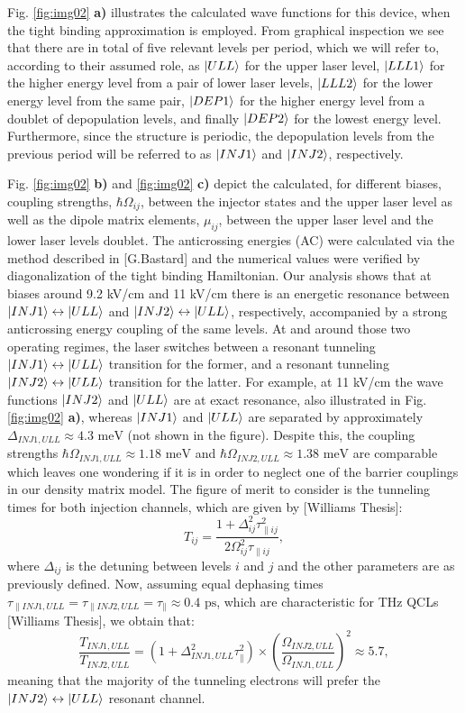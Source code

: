 \documentclass[10pt,letterpaper]{article}
\begin{document}
{Fig. \ref{fig:img02} \textbf{a)} illustrates the calculated wave functions for this device, when the tight binding approximation is employed. From graphical inspection we see that there are in total of five relevant levels per period, which we will refer to, according to their assumed role, as $\Ket{ULL}$ for the upper laser level, $\Ket{LLL1}$ for the higher energy level from a pair of lower laser levels, $\Ket{LLL2}$ for the lower energy level from the same pair, $\Ket{DEP1}$ for the higher energy level from a doublet of depopulation levels, and finally $\Ket{DEP2}$ for the lowest energy level. Furthermore, since the structure is periodic, the depopulation levels from the previous period will be referred to as $\Ket{INJ1}$ and $\Ket{INJ2}$, respectively.

Fig. \ref{fig:img02} \textbf{b)} and \ref{fig:img02} \textbf{c)} depict the calculated, for different biases, coupling strengths, $\hbar \Omega_{ij}$, between the injector states and the upper laser level as well as the dipole matrix elements, $\mu_{ij}$, between the upper laser level and the lower laser levels doublet. The anticrossing energies (AC) were calculated via the method described in [G.Bastard] and the numerical values were verified by diagonalization of the tight binding Hamiltonian. Our analysis shows that at biases around 9.2 kV/cm and 11 kV/cm there is an energetic resonance between $\Ket{INJ1} \leftrightarrow \Ket{ULL}$ and $\Ket{INJ2} \leftrightarrow \Ket{ULL}$, respectively, accompanied by a strong anticrossing energy coupling of the same levels. At and around those two operating regimes, the laser switches between a resonant tunneling $\Ket{INJ1}\leftrightarrow \Ket{ULL}$ transition for the former, and a resonant tunneling  $\Ket{INJ2} \leftrightarrow \Ket{ULL}$ transition for the latter. For example, at 11 kV/cm the wave functions $\ket{INJ2}$ and $\Ket{ULL}$ are at exact resonance, also illustrated in Fig. \ref{fig:img02} \textbf{a)}, whereas $\Ket{INJ1}$ and $\Ket{ULL}$ are separated by approximately $\Delta_{INJ1,ULL} \approx 4.3 \text{ meV}$ (not shown in the figure). Despite this, the coupling strengths $\hbar \Omega_{INJ1,ULL} \approx 1.18 \text{ meV}$ and $\hbar \Omega_{INJ2,ULL} \approx 1.38 \text{ meV}$ are comparable which leaves one wondering if it is in order to neglect one of the barrier couplings in our density matrix model. The figure of merit to consider is the tunneling times for both injection channels, which are given by [Williams Thesis]:
$$
T_{ij} = \frac{1+\Delta_{ij}^2\tau_{\parallel ij}^2}{2\Omega_{ij}^2\tau_{\parallel ij}}, 
$$ 
where $\Delta_{ij}$ is the detuning between levels $i$ and $j$ and the other parameters are as previously defined. Now, assuming equal dephasing times $\tau_{\parallel INJ1,ULL} = \tau_{\parallel INJ2,ULL} = \tau_{\parallel}\approx 0.4 \text{ ps}$, which are characteristic for THz QCLs [Williams Thesis], we obtain that:
$$
\frac{T_{INJ1,ULL}}{T_{INJ2,ULL}} = \left(1+\Delta_{INJ1,ULL}^2\tau_{\parallel}^2\right)\times \left(\frac{\Omega_{INJ2,ULL}}{\Omega_{INJ1,ULL}}\right)^2 \approx 5.7, 
$$ 
meaning that the majority of the tunneling electrons will prefer the $\Ket{INJ2} \leftrightarrow \Ket{ULL}$ resonant channel.

}
\end{document}
